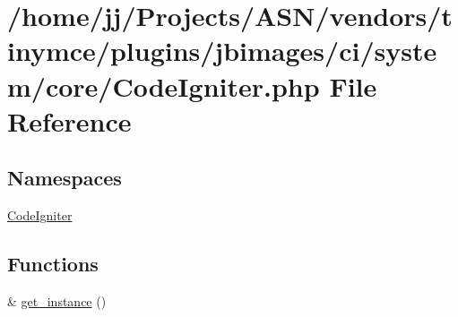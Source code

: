 \hypertarget{_code_igniter_8php}{}\section{/home/jj/\+Projects/\+A\+S\+N/vendors/tinymce/plugins/jbimages/ci/system/core/\+Code\+Igniter.php File Reference}
\label{_code_igniter_8php}
\subsection*{Namespaces}
\begin{DoxyCompactItemize}
\item 
 \hyperlink{namespace_code_igniter}{Code\+Igniter}
\end{DoxyCompactItemize}
\subsection*{Functions}
\begin{DoxyCompactItemize}
\item 
\& \hyperlink{_code_igniter_8php_a185483844bd20a0e80955460d66d2199}{get\+\_\+instance} ()
\end{DoxyCompactItemize}
